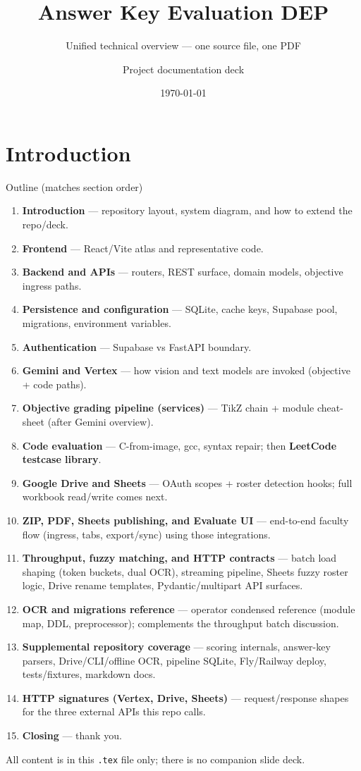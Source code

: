 \documentclass[aspectratio=169]{beamer}
\title[Presentation 3]{Answer Key Evaluation DEP}
\subtitle{Unified technical overview --- one source file, one PDF}
\author{Project documentation deck}
\date{\today}
\begin{document}
\begin{frame}\titlepage\end{frame}

\section{Introduction}

\begin{frame}{Outline (matches section order)}
  \small
  \begin{enumerate}
    \item \textbf{Introduction} --- repository layout, system diagram, and how to extend the repo/deck.
    \item \textbf{Frontend} --- React/Vite atlas and representative code.
    \item \textbf{Backend and APIs} --- routers, REST surface, domain models, objective ingress paths.
    \item \textbf{Persistence and configuration} --- SQLite, cache keys, Supabase pool, migrations, environment variables.
    \item \textbf{Authentication} --- Supabase vs FastAPI boundary.
    \item \textbf{Gemini and Vertex} --- how vision and text models are invoked (objective + code paths).
    \item \textbf{Objective grading pipeline (services)} --- TikZ chain + module cheat-sheet (after Gemini overview).
    \item \textbf{Code evaluation} --- C-from-image, gcc, syntax repair; then \textbf{LeetCode testcase library}.
    \item \textbf{Google Drive and Sheets} --- OAuth scopes + roster detection hooks; full workbook read/write comes next.
    \item \textbf{ZIP, PDF, Sheets publishing, and Evaluate UI} --- end-to-end faculty flow (ingress, tabs, export/sync) using those integrations.
    \item \textbf{Throughput, fuzzy matching, and HTTP contracts} --- batch load shaping (token buckets, dual OCR), streaming pipeline, Sheets fuzzy roster logic, Drive rename templates, Pydantic/multipart API surfaces.
    \item \textbf{OCR and migrations reference} --- operator condensed reference (module map, DDL, preprocessor); complements the throughput batch discussion.
    \item \textbf{Supplemental repository coverage} --- scoring internals, answer-key parsers, Drive/CLI/offline OCR, pipeline SQLite, Fly/Railway deploy, tests/fixtures, markdown docs.
    \item \textbf{HTTP signatures (Vertex, Drive, Sheets)} --- request/response shapes for the three external APIs this repo calls.
    \item \textbf{Closing} --- thank you.
  \end{enumerate}
  \vfill
  \footnotesize All content is in this \texttt{.tex} file only; there is no companion slide deck.
\end{frame}
\end{document}
